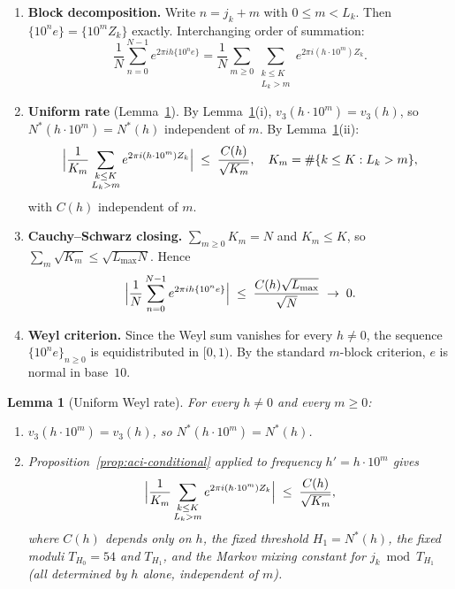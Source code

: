 \documentclass[
]{article}
\newtheorem{lemma}[theorem]{Lemma}
\begin{document}
\begin{enumerate}
\item \textbf{Block decomposition.}
  Write $n = j_k + m$ with $0\le m < L_k$.
  Then $\{10^n e\} = \{10^m Z_k\}$ exactly.
  Interchanging order of summation:
  \[
    \frac{1}{N}\sum_{n=0}^{N-1} e^{2\pi ih\{10^n e\}}
    = \frac{1}{N}\sum_{m\ge 0}\sum_{\substack{k\le K\\L_k>m}}
      e^{2\pi i(h\cdot 10^m)Z_k}.
  \]
\item \textbf{Uniform rate} (Lemma~\ref{lem:uniform-weyl-rate}).
  By Lemma~\ref{lem:uniform-weyl-rate}(i), $v_3(h\cdot 10^m)=v_3(h)$,
  so $N^*(h\cdot 10^m)=N^*(h)$ independent of $m$.
  By Lemma~\ref{lem:uniform-weyl-rate}(ii):
  \[
    \Bigl|\frac{1}{K_m}\sum_{\substack{k\le K\\L_k>m}}
      e^{2\pi i(h\cdot 10^m)Z_k}\Bigr|
    \;\le\;\frac{C(h)}{\sqrt{K_m}},
    \quad K_m = \#\{k\le K : L_k > m\},
  \]
  with $C(h)$ independent of $m$.
\item \textbf{Cauchy--Schwarz closing.}
  $\sum_{m\ge 0} K_m = N$ and $K_m \le K$, so $\sum_m\sqrt{K_m}\le\sqrt{L_{\max}N}$.
  Hence
  \[
    \Bigl|\frac{1}{N}\sum_{n=0}^{N-1} e^{2\pi ih\{10^n e\}}\Bigr|
    \;\le\; \frac{C(h)\sqrt{L_{\max}}}{\sqrt{N}} \;\to\; 0.
  \]
\item \textbf{Weyl criterion.}
  Since the Weyl sum vanishes for every $h\ne 0$, the sequence
  $\{10^n e\}_{n\ge 0}$ is equidistributed in $[0,1)$.
  By the standard $m$-block criterion, $e$ is normal in base~$10$.
\end{enumerate}

\begin{lemma}[Uniform Weyl rate]\label{lem:uniform-weyl-rate}
For every $h\ne 0$ and every $m\ge 0$:
\begin{enumerate}
\item[\emph{(i)}] $v_3(h\cdot 10^m)=v_3(h)$, so $N^*(h\cdot 10^m)=N^*(h)$.
\item[\emph{(ii)}] Proposition~\ref{prop:aci-conditional} applied to frequency
  $h'=h\cdot 10^m$ gives
  \[
    \Bigl|\frac{1}{K_m}\sum_{\substack{k\le K\\L_k>m}}
      e^{2\pi i(h\cdot 10^m)Z_k}\Bigr|\;\le\;\frac{C(h)}{\sqrt{K_m}},
  \]
  where $C(h)$ depends only on $h$, the fixed threshold $H_1=N^*(h)$,
  the fixed moduli $T_{H_0}=54$ and $T_{H_1}$, and the Markov mixing constant
  for $j_k\bmod T_{H_1}$ (all determined by $h$ alone, independent of $m$).
\end{enumerate}
\end{lemma}
\end{document}
